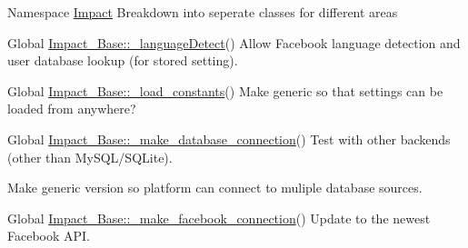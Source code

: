 \label{todo__todo000002}
\hypertarget{todo__todo000002}{}
 
\begin{DoxyDescription}
\item[Namespace \hyperlink{namespaceImpact}{Impact} ]Breakdown into seperate classes for different areas


\end{DoxyDescription}

\label{todo__todo000007}
\hypertarget{todo__todo000007}{}
 
\begin{DoxyDescription}
\item[Global \hyperlink{classImpact__Base_a06e0d9a42275d91e76f877af01c9b0de}{Impact\_\-Base::\_\-languageDetect}() ]Allow Facebook language detection and user database lookup (for stored setting). 
\end{DoxyDescription}

\label{todo__todo000003}
\hypertarget{todo__todo000003}{}
 
\begin{DoxyDescription}
\item[Global \hyperlink{classImpact__Base_a2c7019c3058ec100b498ed14dd2c4d23}{Impact\_\-Base::\_\-load\_\-constants}() ]Make generic so that settings can be loaded from anywhere? 
\end{DoxyDescription}

\label{todo__todo000009}
\hypertarget{todo__todo000009}{}
 
\begin{DoxyDescription}
\item[Global \hyperlink{classImpact__Base_a16870e7c667f514a099afacc1009252b}{Impact\_\-Base::\_\-make\_\-database\_\-connection}() ]Test with other backends (other than MySQL/SQLite). 

Make generic version so platform can connect to muliple database sources. 
\end{DoxyDescription}

\label{todo__todo000004}
\hypertarget{todo__todo000004}{}
 
\begin{DoxyDescription}
\item[Global \hyperlink{classImpact__Base_ab2e18c82d6909c852402b07aa48340bc}{Impact\_\-Base::\_\-make\_\-facebook\_\-connection}() ]Update to the newest Facebook API. 
\end{DoxyDescription}

\label{todo__todo000006}
\hypertarget{todo__todo000006}{}
 
